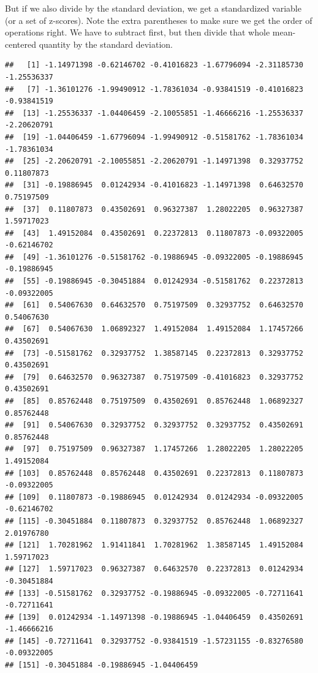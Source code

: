 \documentclass[
]{book}
\newenvironment{Shaded}{\begin{snugshade}}{\end{snugshade}}
\newcommand{\FunctionTok}[1]{\textcolor[rgb]{0.00,0.00,0.00}{#1}}
\newcommand{\NormalTok}[1]{#1}
\newcommand{\SpecialCharTok}[1]{\textcolor[rgb]{0.00,0.00,0.00}{#1}}
\begin{document}
But if we also divide by the standard deviation, we get a standardized variable (or a set of z-scores). Note the extra parentheses to make sure we get the order of operations right. We have to subtract first, but then divide that whole mean-centered quantity by the standard deviation.

\begin{Shaded}
\end{Shaded}

\begin{verbatim}
##   [1] -1.14971398 -0.62146702 -0.41016823 -1.67796094 -2.31185730 -1.25536337
##   [7] -1.36101276 -1.99490912 -1.78361034 -0.93841519 -0.41016823 -0.93841519
##  [13] -1.25536337 -1.04406459 -2.10055851 -1.46666216 -1.25536337 -2.20620791
##  [19] -1.04406459 -1.67796094 -1.99490912 -0.51581762 -1.78361034 -1.78361034
##  [25] -2.20620791 -2.10055851 -2.20620791 -1.14971398  0.32937752  0.11807873
##  [31] -0.19886945  0.01242934 -0.41016823 -1.14971398  0.64632570  0.75197509
##  [37]  0.11807873  0.43502691  0.96327387  1.28022205  0.96327387  1.59717023
##  [43]  1.49152084  0.43502691  0.22372813  0.11807873 -0.09322005 -0.62146702
##  [49] -1.36101276 -0.51581762 -0.19886945 -0.09322005 -0.19886945 -0.19886945
##  [55] -0.19886945 -0.30451884  0.01242934 -0.51581762  0.22372813 -0.09322005
##  [61]  0.54067630  0.64632570  0.75197509  0.32937752  0.64632570  0.54067630
##  [67]  0.54067630  1.06892327  1.49152084  1.49152084  1.17457266  0.43502691
##  [73] -0.51581762  0.32937752  1.38587145  0.22372813  0.32937752  0.43502691
##  [79]  0.64632570  0.96327387  0.75197509 -0.41016823  0.32937752  0.43502691
##  [85]  0.85762448  0.75197509  0.43502691  0.85762448  1.06892327  0.85762448
##  [91]  0.54067630  0.32937752  0.32937752  0.32937752  0.43502691  0.85762448
##  [97]  0.75197509  0.96327387  1.17457266  1.28022205  1.28022205  1.49152084
## [103]  0.85762448  0.85762448  0.43502691  0.22372813  0.11807873 -0.09322005
## [109]  0.11807873 -0.19886945  0.01242934  0.01242934 -0.09322005 -0.62146702
## [115] -0.30451884  0.11807873  0.32937752  0.85762448  1.06892327  2.01976780
## [121]  1.70281962  1.91411841  1.70281962  1.38587145  1.49152084  1.59717023
## [127]  1.59717023  0.96327387  0.64632570  0.22372813  0.01242934 -0.30451884
## [133] -0.51581762  0.32937752 -0.19886945 -0.09322005 -0.72711641 -0.72711641
## [139]  0.01242934 -1.14971398 -0.19886945 -1.04406459  0.43502691 -1.46666216
## [145] -0.72711641  0.32937752 -0.93841519 -1.57231155 -0.83276580 -0.09322005
## [151] -0.30451884 -0.19886945 -1.04406459
\end{verbatim}
\end{document}

